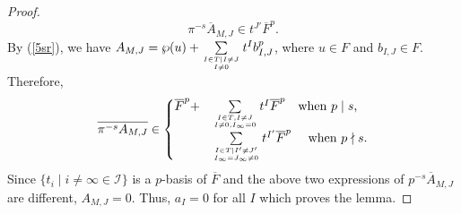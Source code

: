 \documentclass[times,10pt]{amsart}
\newcommand{\dd}{{\rm d}}
\newcommand{\I}{\ensuremath{\mathcal{I}}}
\newcommand{\n}{\ensuremath{\infty}}
\renewcommand{\phi}{\varphi}
\newtheorem{prop}[thm]{Proposition}%
\begin{document}
\begin{proof}
\begin{equation}
         \overline{{\pi^{-s}} A_{M,J}}\in  t^{J'} \overline{F}^p. 
     \end{equation}{ By (\ref{5sr}), we have    $ A_{M,J}= \wp(u)+ \sum\limits_{I\in T\mid I\neq J\atop I\neq 0} t^Ib^p_{I,J}$, where $u\in F$ and $b_{I,J}\in F$. Therefore,  \begin{equation*}
         \overline{{\pi^{-s}}  A_{M,J}} \in  \begin{cases}
             \overline{F}^p +& \sum\limits_{I\in T, I\neq J\atop I\neq 0, I_{\infty}=0} t^I \overline{F}^p\quad \text{when $p\mid s$,}\\ &\sum\limits_{I\in T\mid I'\neq J'\atop I_{\infty}=J_{\infty}\neq 0 }t^{I'} \overline{F}^p\quad\text{ when $p\nmid s$.}  
         \end{cases}
     \end{equation*} }Since $ \{t_i\mid i\neq \n\in {\I}\}$ is a $p$-basis of $\overline{F}$ and the above two expressions of $ \overline{p^{-s}  A_{M,J}}$ are different, $A_{M,J}=0$. Thus, $a_I=0$ for all $I$ which proves the lemma.
    
\end{proof}

        
\end{document}
